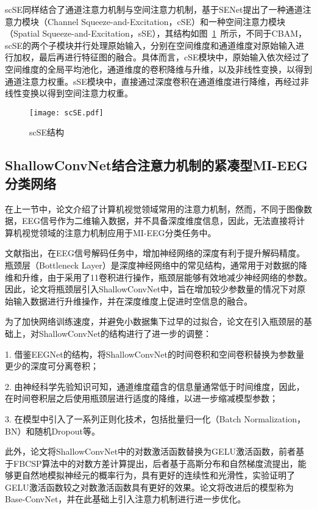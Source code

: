 scSE同样结合了通道注意力机制与空间注意力机制，基于SENet提出了一种通道注意力模块（Channel Squeeze-and-Excitation，cSE）和一种空间注意力模块（Spatial Squeeze-and-Excitation，sSE），其结构如图~\ref{fig:scSE}~所示，不同于CBAM，scSE的两个子模块并行处理原始输入，分别在空间维度和通道维度对原始输入进行加权，最后再进行特征图的融合。具体而言，cSE模块中，原始输入依次经过了空间维度的全局平均池化，通道维度的卷积降维与升维，以及非线性变换，以得到通道注意力权重。sSE模块中，直接通过深度卷积在通道维度进行降维，再经过非线性变换以得到空间注意力权重。
\begin{figure}
    \centering
    \texttt{[image: scSE.pdf]}
    \caption{scSE结构}
    \label{fig:scSE}
\end{figure}

\subsection{ShallowConvNet结合注意力机制的紧凑型MI-EEG分类网络}

在上一节中，论文介绍了计算机视觉领域常用的注意力机制，然而，不同于图像数据，EEG信号作为二维输入数据，并不具备深度维度信息，因此，无法直接将计算机视觉领域的注意力机制应用于MI-EEG分类任务中。

文献\cite{lawhern2018eegnet}\cite{schirrmeister2017deep}指出，在EEG信号解码任务中，增加神经网络的深度有利于提升解码精度。瓶颈层（Bottleneck Layer）是深度神经网络中的常见结构\cite{he2016deep}\cite{huang2017densely}，通常用于对数据的降维和升维，由于采用了1\times1卷积进行操作，瓶颈层能够有效地减少神经网络的参数。因此，论文将瓶颈层引入ShallowConvNet中，旨在增加较少参数量的情况下对原始输入数据进行升维操作，并在深度维度上促进时空信息的融合。

为了加快网络训练速度，并避免小数据集下过早的过拟合，论文在引入瓶颈层的基础上，对ShallowConvNet的结构进行了进一步的调整：

1. 借鉴EEGNet\cite{lawhern2018eegnet}的结构，将ShallowConvNet的时间卷积和空间卷积替换为参数量更少的深度可分离卷积\cite{lawhern2018eegnet}；

2. 由神经科学先验知识可知，通道维度蕴含的信息量通常低于时间维度，因此，在时间卷积层之后使用瓶颈层进行适度的降维，以进一步缩减模型参数；

3. 在模型中引入了一系列正则化技术，包括批量归一化（Batch Normalization，BN）和随机Dropout等。

此外，论文将ShallowConvNet中的对数激活函数替换为GELU激活函数，前者基于FBCSP算法中的对数方差计算提出，后者基于高斯分布和自然梯度流提出，能够更自然地模拟神经元的概率行为，具有更好的连续性和光滑性\cite{hendrycks2016gaussian}，实验证明了GELU激活函数较之对数激活函数具有更好的效果。论文将改进后的模型称为Base-ConvNet，并在此基础上引入注意力机制进行进一步优化。

